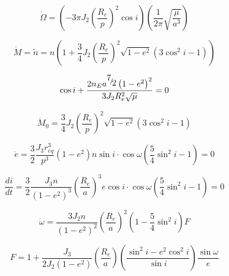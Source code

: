\documentclass{article}
\begin{document}
\begin{equation}
\dot \Omega  = \left( { - 3\pi J_2 \left( {\frac{{R_e }}
{p}} \right)^2 \cos i} \right)\left( {\frac{1}
{{2\pi }}\sqrt {\frac{\mu }
{{a^3 }}} } \right)
\label{RAAN}
\end{equation}

\begin{equation}
\dot M = \tilde n = n\left( {1 + \frac{3}
{4}J_2 \left( {\frac{{R_e }}
{p}} \right)^2 \sqrt {1 - e^2 } \left( {3\cos ^2 i - 1} \right)} \right)
\label{MDot}
\end{equation}


\begin{equation}
\cos i + \frac{{2n_E a^{{\raise0.7ex\hbox{$7$} \!\mathord{\left/
 {\vphantom {7 2}}\right.\kern-\nulldelimiterspace}
\!\lower0.7ex\hbox{$2$}}} \left( {1 - e^2 } \right)^2 }}
{{3J_2 R_e ^2 \sqrt \mu  }} = 0
\label{SunSynch}
\end{equation}

\begin{equation}
\dot M_0  = \frac{3}
{4}J_2 \left( {\frac{{R_e }}
{p}} \right)^2 \sqrt {1 - e^2 } \left( {3\cos ^2 i - 1} \right)
\label{SunSynchMean}
\end{equation}



\begin{equation}
\dot e = \frac{3}
{2}\frac{{J_3 r_{eq}^3 }}
{{p^3 }}\left( {1 - e^2 } \right)n\sin i \cdot \cos \omega \left( {\frac{5}
{4}\sin ^2 i - 1} \right) = 0
\label{FrozenEcc}
\end{equation}

\begin{equation}
\frac{{di}}
{{dt}} = \frac{3}
{2}\frac{{J_3 n}}
{{\left( {1 - e^2 } \right)^3 }}\left( {\frac{{R_e }}
{a}} \right)^3 e\cos i \cdot \cos \omega \left( {\frac{5}
{4}\sin ^2 i - 1} \right) = 0
\label{FrozenInc}
\end{equation}

\begin{equation}
\dot \omega  = \frac{{3J_2 n}}
{{\left( {1 - e^2 } \right)^2 }}\left( {\frac{{R_e }}
{a}} \right)^2 \left( {1 - \frac{5}
{4}\sin ^2 i} \right)F
\label{FrozenArg}
\end{equation}

\begin{equation}
F = 1 + \frac{{J_3 }}
{{2J_2 \left( {1 - e^2 } \right)}}\left( {\frac{{R_e }}
{a}} \right)\left( {\frac{{\sin ^2 i - e^2 \cos ^2 i}}
{{\sin i}}} \right)\frac{{\sin \omega }}
{e}
\label{FrozenF}
\end{equation}
\end{document}
